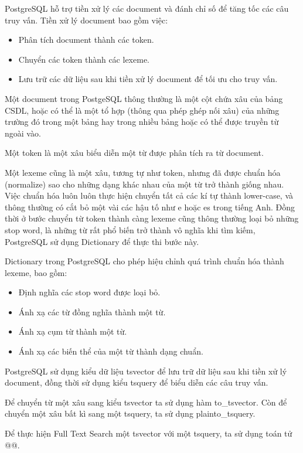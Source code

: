 PostgreSQL hỗ trợ tiền xử lý các document và đánh chỉ
số để tăng tốc các câu truy vấn. Tiền xử lý document bao gồm việc:
\begin{itemize}[topsep=0ex]
\item Phân tích document thành các token.
\item Chuyển các token thành các lexeme.
\item Lưu trữ các dữ liệu sau khi tiền xử lý
    document để tối ưu cho truy vấn.
\end{itemize}

Một document trong PostgeSQL thông thường là một cột chứa
xâu của bảng CSDL, hoặc có thể là một 
tổ hợp (thông qua phép ghép nối xâu) của những trường
đó trong một bảng hay trong nhiều bảng hoặc
có thể được truyền từ ngoài vào. 

Một token là một xâu biểu diễn một từ được phân tích ra từ document.

Một lexeme cũng là một xâu, tương tự như token, nhưng đã
được chuẩn hóa (normalize) sao cho những dạng khác nhau của
một từ trở thành giống nhau. Việc chuẩn hóa luôn luôn
thực hiện chuyển tất cả các kí tự thành lower-case, và thông
thường có cắt bỏ một vài các hậu tố như e hoặc es trong tiếng
Anh. Đồng thời ở bước chuyển từ token thành càng lexeme cũng
thông thường loại bỏ những stop word, là những từ rất phổ biến
trở thành vô nghĩa khi tìm kiếm, PostgreSQL sử dụng Dictionary
để thực thi bước này.

Dictionary trong PostgreSQL cho phép hiệu chỉnh quá trình
chuẩn hóa thành lexeme, bao gồm:
\begin{itemize}[topsep=0ex]
\item Định nghĩa các stop word được loại bỏ.
\item Ánh xạ các từ đồng nghĩa thành một từ.
\item Ánh xạ cụm từ thành một từ.
\item Ánh xạ các biến thể của một từ thành dạng chuẩn.
\end{itemize}

PostgreSQL sử dụng kiểu dữ liệu tsvector để lưu trữ dữ
liệu sau khi tiền xử lý document, đồng thời sử dụng kiểu
tsquery để biểu diễn các câu truy vấn.

Để chuyển từ một xâu sang kiểu tsvector ta sử dụng hàm
to\_tsvector. Còn để chuyển một xâu bất kì sang một tsquery,
ta sử dụng plainto\_tsquery. 

Để thực hiện Full Text Search một tsvector với một tsquery,
ta sử dụng toán tử @@.

